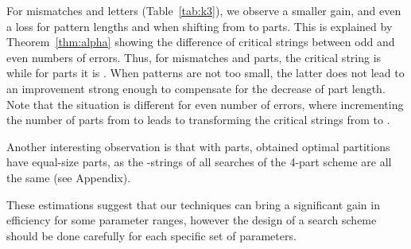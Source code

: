 \documentclass[12pt]{article}
\begin{document}
For  mismatches and  letters (Table~\ref{tab:k3}), 
we observe a smaller gain, and even a loss for pattern lengths  and
 when shifting from  to  parts.
This is explained by Theorem~\ref{thm:alpha} showing the
difference of critical strings between odd and even numbers of
errors. 
Thus, for  mismatches and  parts, the
critical string is  
while for  parts it is . 
When patterns are not too small, the latter does not lead to an improvement strong enough
to compensate for the decrease of part length. 
Note that the situation is different for even number of errors, where incrementing the number of parts from
 to  leads to transforming the critical strings from
 to . 

Another interesting observation is that with  parts, obtained
optimal partitions have equal-size parts, as the -strings
of all searches of the 4-part scheme are all the same (see Appendix). 



These estimations suggest that our techniques can 
bring a
significant gain in efficiency for some parameter ranges, however the
design of a search scheme should be done carefully for each specific
set of parameters.
\end{document}
